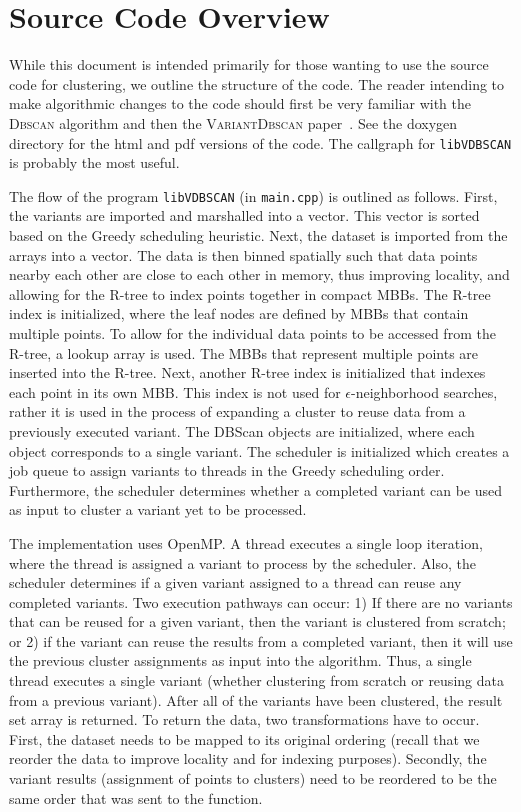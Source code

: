 \documentclass[12pt]{article}
\def\eps{$\epsilon$\xspace}
\def\dbscan{\textsc{Dbscan}\xspace}
\def\vdbscan{\textsc{VariantDbscan}\xspace}
\begin{document}
\section{Source Code Overview}
While this document is intended primarily for those wanting to use the source code for clustering, we outline the structure of the code.  The reader intending to make algorithmic changes to the code should first be very familiar with the \dbscan algorithm and then the \vdbscan paper~\cite{Gowanlock2016}.  See the doxygen directory for the html and pdf versions of the code. The callgraph for \texttt{libVDBSCAN} is probably the most useful.

The flow of the program \texttt{libVDBSCAN} (in \texttt{main.cpp}) is outlined as follows.  First, the variants are imported and marshalled into a vector. This vector is sorted based on the Greedy scheduling heuristic.  Next, the dataset is imported from the arrays into a vector. The data is then binned spatially such that data points nearby each other are close to each other in memory, thus improving locality, and allowing for the R-tree to index points together in compact MBBs.  The R-tree index is initialized, where the leaf nodes are defined by MBBs that contain multiple points.  To allow for the individual data points to be accessed from the R-tree, a lookup array is used. The MBBs that  represent multiple points are inserted into the R-tree. Next, another R-tree index is initialized that indexes each point in its own MBB. This index is not used for \eps-neighborhood searches, rather it is used in the process of expanding a cluster to reuse data from a previously executed variant.  The DBScan objects are initialized, where each object corresponds to a single variant. The scheduler is initialized which creates a job queue to assign variants to threads in the Greedy scheduling order. Furthermore, the scheduler determines whether a completed variant can be used as input to cluster a variant yet to be processed.  

The implementation uses OpenMP. A thread executes a single loop iteration, where the thread is assigned a variant to process by the scheduler. Also, the scheduler determines if a given variant assigned to a thread can reuse any completed variants. Two execution pathways can occur: 1) If there are no variants that can be reused for a given variant, then the variant is clustered from scratch; or 2) if the variant can reuse the results from a completed variant, then it will use the previous cluster assignments as input into the algorithm. Thus, a single thread executes a single variant (whether clustering from scratch or reusing data from a previous variant). After all of the variants have been clustered, the result set array is returned.  To return the data, two transformations have to occur. First, the dataset needs to be mapped to its original ordering (recall that we reorder the data to improve locality and for indexing purposes). Secondly, the variant results (assignment of points to clusters) need to be reordered to be the same order that was sent to the function. 
\end{document}
